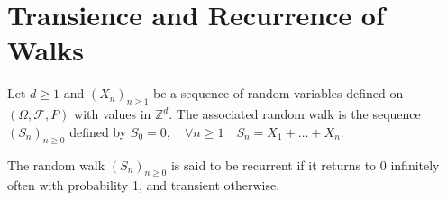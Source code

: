 \chapter{Transience and Recurrence of Walks}%
\sloppy

Let $d \ge 1$ and $(X_n)_{n \ge 1}$ be a sequence of random variables defined on $(\Omega, \mathcal{F}, P)$ with values in $\mathbb{Z}^d$. The associated random walk is the sequence $(S_n)_{n \ge 0}$ defined by $S_0=0, \quad \forall n \ge 1 \quad S_n=X_1+\dots+X_n$.

The random walk $(S_n)_{n \ge 0}$ is said to be recurrent if it returns to 0 infinitely often with probability 1, and transient otherwise.%
